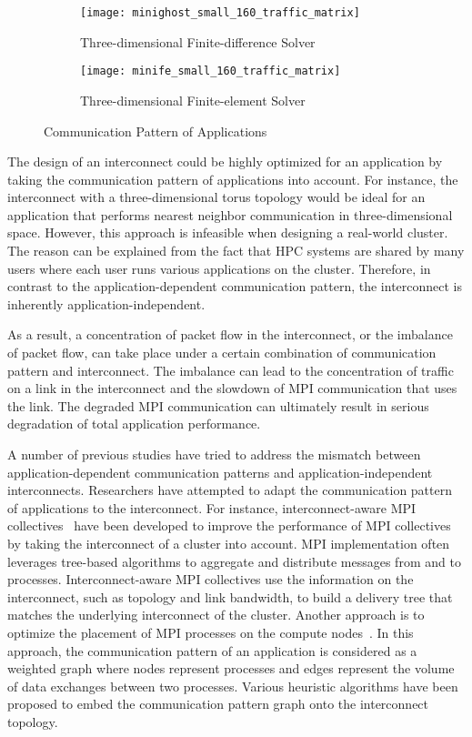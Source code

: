\begin{figure}
    \centering
    \begin{subfigure}{\linewidth}
        \centering
        \texttt{[image: minighost\_small\_160\_traffic\_matrix]}
        \caption{Three-dimensional Finite-difference Solver}%
        \label{fig:minighost}
    \end{subfigure}
    \begin{subfigure}{\linewidth}
        \centering
        \texttt{[image: minife\_small\_160\_traffic\_matrix]}
        \caption{Three-dimensional Finite-element Solver}%
        \label{fig:minife}
    \end{subfigure}
    \caption{Communication Pattern of Applications}
\end{figure}

The design of an interconnect could be highly optimized for an
application by taking the communication pattern of applications into account.
For instance, the interconnect with a three-dimensional torus topology would
be ideal for an application that performs nearest neighbor communication in
three-dimensional space. However, this approach is infeasible when designing a
real-world cluster. The reason can be explained from the fact that HPC systems
are shared by many users where each user runs various applications on the
cluster. Therefore, in contrast to the application-dependent communication
pattern, the interconnect is inherently application-independent.

As a result, a concentration of packet flow in the interconnect, or the
imbalance of packet flow, can take place under a certain combination of
communication pattern and interconnect. The imbalance can lead to the
concentration of traffic on a link in the interconnect and the slowdown of MPI
communication that uses the link. The degraded MPI communication can
ultimately result in serious degradation of total application performance.

A  number of previous studies have tried to address the mismatch between
application-dependent communication patterns and application-independent
interconnects. Researchers have attempted to adapt the communication
pattern of applications to the interconnect. For instance, interconnect-aware
MPI collectives~\autocite{Kumar2016,Kumar2014,Gong2015,Adachi2013} have been
developed to improve the performance of MPI collectives by taking the
interconnect of a cluster into account. MPI implementation often leverages
tree-based algorithms to aggregate and distribute messages from and to
processes. Interconnect-aware MPI collectives use the information on the
interconnect, such as topology and link bandwidth, to build a delivery tree
that matches the underlying interconnect of the cluster. Another approach is
to optimize the placement of MPI processes on the compute
nodes~\autocite{Michelogiannakis2017,Hoefler2011,Choi2017}. In this
approach, the communication pattern of an application is considered as a
weighted graph where nodes represent processes and edges represent the volume
of data exchanges between two processes. Various heuristic algorithms have
been proposed to embed the communication pattern graph onto the interconnect
topology.


